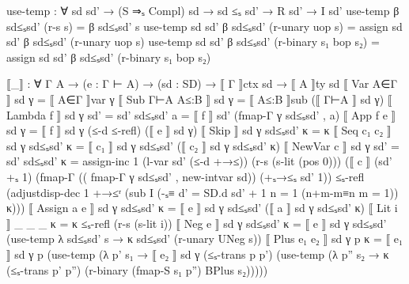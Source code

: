 \documentclass{article}
\begin{document}
\begin{prev}
\begin{code}
use-temp : ∀ {sd sd'} → (S ⇒ₛ Compl) sd → sd ≤ₛ sd' → R sd' → I sd'
use-temp β sd≤ₛsd' (r-s s) = β sd≤ₛsd' s
use-temp {sd} {sd'} β sd≤ₛsd' (r-unary uop s) = 
    assign sd sd' β sd≤ₛsd' (r-unary uop s)
use-temp {sd} {sd'} β sd≤ₛsd' (r-binary s₁ bop s₂) = 
    assign sd sd' β sd≤ₛsd' (r-binary s₁ bop s₂)


⟦_⟧ : ∀ {Γ A} → (e : Γ ⊢ A) → (sd : SD) → ⟦ Γ ⟧ctx sd → ⟦ A ⟧ty sd
⟦ Var A∈Γ ⟧ sd γ = ⟦ A∈Γ ⟧var γ
⟦ Sub Γ⊢A A≤:B ⟧ sd γ = ⟦ A≤:B ⟧sub (⟦ Γ⊢A ⟧ sd γ)
⟦ Lambda f ⟧ sd γ {sd' = sd'} sd≤ₛsd' a = ⟦ f ⟧ sd' (fmap-Γ γ sd≤ₛsd' , a) 
⟦ App f e ⟧ sd γ = ⟦ f ⟧ sd γ (≤-d ≤-refl) (⟦ e ⟧ sd γ)
⟦ Skip ⟧ sd γ sd≤ₛsd' κ = κ
⟦ Seq c₁ c₂ ⟧ sd γ sd≤ₛsd' κ = ⟦ c₁ ⟧ sd γ sd≤ₛsd' (⟦ c₂ ⟧ sd γ sd≤ₛsd' κ)
⟦ NewVar c ⟧ sd γ {sd' = sd'} sd≤ₛsd' κ = assign-inc 1 (l-var sd' (≤-d +→≤)) (r-s (s-lit (pos 0))) (⟦ c ⟧ (sd' +ₛ 1) (fmap-Γ (( fmap-Γ γ sd≤ₛsd' , new-intvar sd)) (+ₛ→≤ₛ {sd'} {1})) ≤ₛ-refl (adjustdisp-dec 1 +→≤ʳ (sub I (-ₛ≡ {d' = SD.d sd' + 1} {n = 1} (n+m-m≡n {m = 1})) κ)))
⟦ Assign a e ⟧ sd γ sd≤ₛsd' κ = ⟦ e ⟧ sd γ sd≤ₛsd' (⟦ a ⟧ sd γ sd≤ₛsd' κ)
⟦ Lit i ⟧ _ _ _ κ = κ ≤ₛ-refl (r-s (s-lit i))
⟦ Neg e ⟧ sd γ sd≤ₛsd' κ = ⟦ e ⟧ sd γ sd≤ₛsd' (use-temp λ sd≤ₛsd' s → κ sd≤ₛsd' (r-unary UNeg s))    
⟦ Plus e₁ e₂ ⟧ sd γ p κ = ⟦ e₁ ⟧ sd γ p (use-temp (λ p' s₁ → ⟦ e₂ ⟧ sd γ (≤ₛ-trans p p') (use-temp (λ p'' s₂ →  κ (≤ₛ-trans p' p'') (r-binary (fmap-S s₁ p'') BPlus s₂))))) 
\end{code}
\end{prev}
\end{document}
